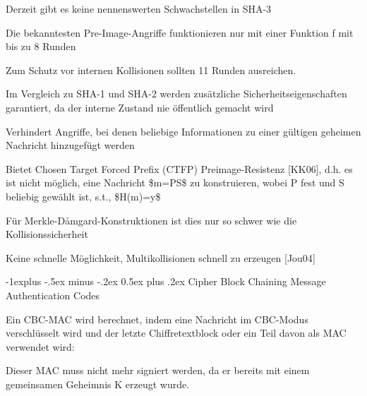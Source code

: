 \documentclass[a4paper]{article}
\makeatletter
\renewcommand{\subsection}{\@startsection{subsection}{2}{0mm}%
 {-1explus -.5ex minus -.2ex}%
 {0.5ex plus .2ex}%
 {\normalfont\normalsize\bfseries}}
\makeatother
\begin{document}
\begin{multicols}{3}
\begin{itemize*}
            \begin{itemize*}
                  \item Derzeit gibt es keine nennenswerten Schwachstellen in SHA-3
                  \begin{itemize*} \item Die bekanntesten Pre-Image-Angriffe funktionieren nur mit einer Funktion f mit bis zu 8 Runden \item Zum Schutz vor internen Kollisionen sollten 11 Runden ausreichen. \end{itemize*}
                  \item Im Vergleich zu SHA-1 und SHA-2 werden zusätzliche Sicherheitseigenschaften garantiert, da der interne Zustand nie öffentlich gemacht wird
                  \begin{itemize*} \item Verhindert Angriffe, bei denen beliebige Informationen zu einer gültigen geheimen Nachricht hinzugefügt werden \item Bietet Chosen Target Forced Prefix (CTFP) Preimage-Resistenz {[}KK06{]}, d.h. es ist nicht möglich, eine Nachricht \$m=P\textbar\textbar S\$ zu konstruieren, wobei P fest und S beliebig gewählt ist, s.t., \$H(m)=y\$ \item Für Merkle-Dåmgard-Konstruktionen ist dies nur so schwer wie die Kollisionssicherheit \item Keine schnelle Möglichkeit, Multikollisionen schnell zu erzeugen {[}Jou04{]} \end{itemize*}
            \end{itemize*}
      \end{itemize*}


      \subsection{Cipher Block Chaining Message Authentication
            Codes}

      \begin{itemize*}
            \item
            Ein CBC-MAC wird berechnet, indem eine Nachricht im CBC-Modus
            verschlüsselt wird und der letzte Chiffretextblock oder ein Teil davon
            als MAC verwendet wird:
            \item
            Dieser MAC muss nicht mehr signiert werden, da er bereits mit einem
            gemeinsamen Geheimnis K erzeugt wurde.


\end{itemize*}
\end{multicols}
\end{document}
